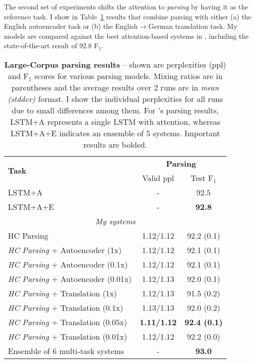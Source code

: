 The second set of experiments shifts the attention to {\it parsing} by having it as the reference task. 
I show in Table~\ref{t:big_big_parsing} results that combine parsing with
either (a) the English autoencoder task or (b) the English$\rightarrow$German
translation task. My models are compared against the best attention-based systems in
\citep{vinyals15grammar}, including the state-of-the-art result of 92.8 F$_1$.

\begin{table}[tbh!]
\centering
\begin{tabular}{l|c|c}
\multirow{ 2}{*}{\bf{Task}}& \multicolumn{2}{c}{{\bf
Parsing}}\\
  \cline{2-3}
  & Valid ppl & Test F$_1$\\
  \hline
  \hline
LSTM+A \citep{vinyals15grammar} &  - & 92.5 \\
LSTM+A+E \citep{vinyals15grammar} & - & {\bf 92.8} \\
  \hline
\multicolumn{3}{c}{{\it My systems}} \\
  \hline
HC Parsing & 1.12/1.12 & 92.2 (0.1) \\
  \hline
{\it HC Parsing} + Autoencoder (1x) & 1.12/1.12 & 92.1 (0.1) \\
{\it HC Parsing} + Autoencoder (0.1x) & 1.12/1.12 & 92.1 (0.1) \\
{\it HC Parsing} + Autoencoder (0.01x) & 1.12/1.13 & 92.0 (0.1) \\
  \hline
{\it HC Parsing} + Translation (1x) & 1.12/1.13 & 91.5 (0.2) \\
{\it HC Parsing} + Translation (0.1x) & 1.13/1.13 & 92.0 (0.2) \\
{\it HC Parsing} + Translation (0.05x) & {\bf 1.11/1.12} & {\bf 92.4 (0.1)} \\
{\it HC Parsing} + Translation (0.01x) & 1.12/1.12 & 92.2 (0.0) \\
  \hline
Ensemble of 6 multi-task systems & - & {\bf 93.0} \\
\end{tabular}
\caption[Large-Corpus parsing results \& translation]{{\bf Large-Corpus parsing results} -- shown are
perplexities (ppl) and F$_1$ scores 
for various parsing models. Mixing ratios are in parentheses and the average
results over 2 runs are in {\it mean (stddev)} format. I show the individual perplexities for all runs
due to small differences among them. For \citet{vinyals15grammar}'s parsing results, LSTM+A
represents a single LSTM with attention, whereas LSTM+A+E indicates an ensemble
of 5 systems. Important results are bolded.}
\label{t:big_big_parsing}
\end{table}


